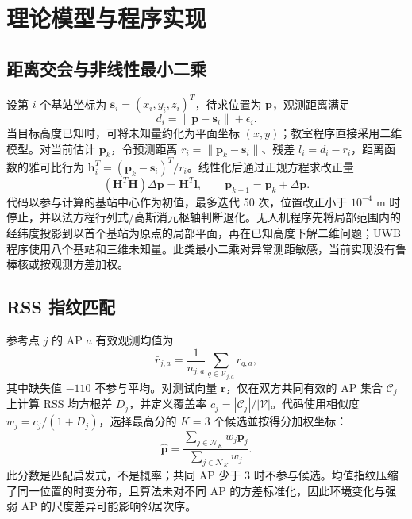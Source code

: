 \section{理论模型与程序实现}
\subsection{距离交会与非线性最小二乘}
设第 $i$ 个基站坐标为 $\bm{s}_i=(x_i,y_i,z_i)^T$，待求位置为 $\bm{p}$，观测距离满足
\begin{equation}
 d_i=\|\bm{p}-\bm{s}_i\|+\epsilon_i .
 \label{eq:range}
\end{equation}
当目标高度已知时，可将未知量约化为平面坐标 $(x,y)$；教室程序直接采用二维模型。对当前估计 $\bm{p}_k$，令预测距离 $r_i=\|\bm{p}_k-\bm{s}_i\|$、残差 $l_i=d_i-r_i$，距离函数的雅可比行为 $\bm{h}_i^T=(\bm{p}_k-\bm{s}_i)^T/r_i$。线性化后通过正规方程求改正量
\begin{equation}
 (\bm{H}^T\bm{H})\Delta\bm{p}=\bm{H}^T\bm{l},\qquad
 \bm{p}_{k+1}=\bm{p}_k+\Delta\bm{p}.
 \label{eq:gn}
\end{equation}
代码以参与计算的基站中心作为初值，最多迭代 50 次，位置改正小于 $10^{-4}$ m 时停止，并以法方程行列式/高斯消元枢轴判断退化。无人机程序先将局部范围内的经纬度投影到以首个基站为原点的局部平面，再在已知高度下解二维问题；UWB 程序使用八个基站和三维未知量。此类最小二乘对异常测距敏感，当前实现没有鲁棒核或按观测方差加权。

\subsection{RSS 指纹匹配}
参考点 $j$ 的 AP $a$ 有效观测均值为
\begin{equation}
 \bar r_{j,a}=\frac{1}{n_{j,a}}\sum_{q\in\mathcal{V}_{j,a}} r_{q,a},
 \label{eq:rss-mean}
\end{equation}
其中缺失值 $-110$ 不参与平均。对测试向量 $\bm{r}$，仅在双方共同有效的 AP 集合 $\mathcal{C}_j$ 上计算 RSS 均方根差 $D_j$，并定义覆盖率 $c_j=|\mathcal{C}_j|/|\mathcal{V}|$。代码使用相似度 $w_j=c_j/(1+D_j)$，选择最高分的 $K=3$ 个候选並按得分加权坐标：
\begin{equation}
 \hat{\bm{p}}=\frac{\sum_{j\in\mathcal{N}_K} w_j\bm{p}_j}
 {\sum_{j\in\mathcal{N}_K}w_j}.
 \label{eq:knn}
\end{equation}
此分数是匹配启发式，不是概率；共同 AP 少于 3 时不参与候选。均值指纹压缩了同一位置的时变分布，且算法未对不同 AP 的方差标准化，因此环境变化与强弱 AP 的尺度差异可能影响邻居次序。

